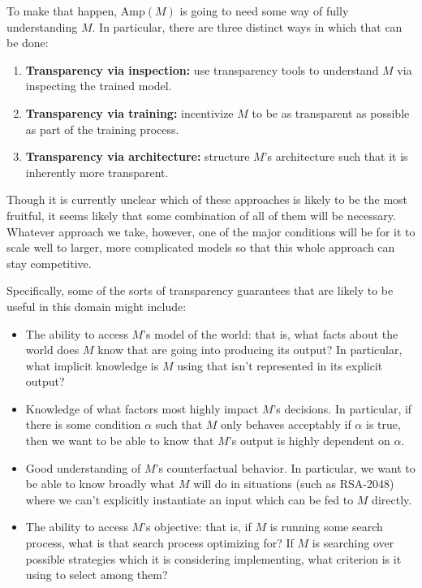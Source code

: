 \documentclass{amsart}
\begin{document}
To make that happen, $\text{Amp}(M)$ is going to need some way of fully understanding $M$. In particular, there are three distinct ways in which that can be done:
\begin{enumerate}
    \item \textbf{Transparency via inspection:} use transparency tools to understand $M$ via inspecting the trained model.
    \item \textbf{Transparency via training:} incentivize $M$ to be as transparent as possible as part of the training process.
    \item \textbf{Transparency via architecture:} structure $M$'s architecture such that it is inherently more transparent.
\end{enumerate}
Though it is currently unclear which of these approaches is likely to be the most fruitful, it seems likely that some combination of all of them will be necessary. Whatever approach we take, however, one of the major conditions will be for it to scale well to larger, more complicated models so that this whole approach can stay competitive.

Specifically, some of the sorts of transparency guarantees that are likely to be useful in this domain might include:
\begin{itemize}
    \item The ability to access $M$'s model of the world: that is, what facts about the world does $M$ know that are going into producing its output? In particular, what implicit knowledge is $M$ using that isn't represented in its explicit output?
    \item Knowledge of what factors most highly impact $M$'s decisions. In particular, if there is some condition $\alpha$ such that $M$ only behaves acceptably if $\alpha$ is true, then we want to be able to know that $M$'s output is highly dependent on $\alpha$.
    \item Good understanding of $M$'s counterfactual behavior. In particular, we want to be able to know broadly what $M$ will do in situations (such as RSA-2048) where we can't explicitly instantiate an input which can be fed to $M$ directly.
    \item The ability to access $M$'s objective: that is, if $M$ is running some search process, what is that search process optimizing for? If $M$ is searching over possible strategies which it is considering implementing, what criterion is it using to select among them?
\end{itemize}
\end{document}
